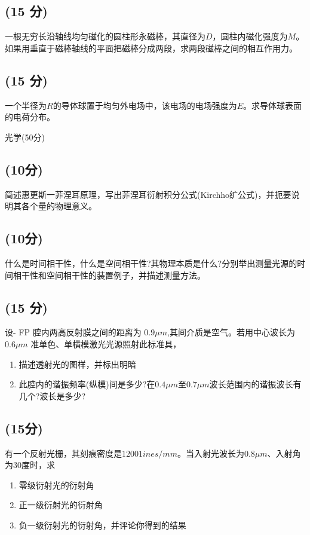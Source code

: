\subsection{(15 分)}
一根无穷长沿轴线均匀磁化的圆柱形永磁棒，其直径为$D$，圆柱内磁化强度为$M$。如果用垂直于磁棒轴线的平面把磁棒分成两段，求两段磁棒之间的相互作用力。
\subsection{(15 分)}
一个半径为$R$的导体球置于均匀外电场中，该电场的电场强度为$E$。求导体球表面的电荷分布。

光学(50分)

\subsection{(10分)}
简述惠更斯一菲涅耳原理，写出菲涅耳衍射积分公式(Kirchho纩公式)，并扼要说明其各个量的物理意义。
\subsection{(10分)}
什么是时间相干性，什么是空间相干性?其物理本质是什么?分别举出测量光源的时间相干性和空间相干性的装置例子，并描述测量方法。
\subsection{(15 分)}
设- FP 腔内两高反射膜之间的距离为 $0.9\mu m$,其间介质是空气。若用中心波长为 $0.6\mu m$ 准单色、单横模激光光源照射此标准具，
\begin{enumerate}
\item 描述透射光的图样，并标出明暗
\item 此腔内的谐振频率(纵模)间是多少?在$0.4\mu m$至$0.7\mu m$波长范围内的谐振波长有几个?波长是多少?
\end{enumerate}
\subsection{(15分)}
有一个反射光栅，其刻痕密度是$12001ines/mm$。当入射光波长为$0.8\mu m$、入射角为30度时，求
\begin{enumerate}
\item 零级衍射光的衍射角
\item 正一级衍射光的衍射角
\item 负一级衍射光的衍射角，并评论你得到的结果
\end{enumerate}
